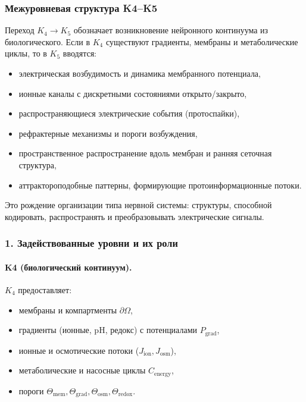 
\subsubsection{Межуровневая структура K4–K5}
\label{sec:crossk-k4-k5}

Переход $K_4 \rightarrow K_5$ обозначает возникновение нейронного
континуума из биологического. Если в $K_4$ существуют градиенты,
мембраны и метаболические циклы, то в $K_5$ вводятся:
\begin{itemize}
  \item электрическая возбудимость и динамика мембранного потенциала,
  \item ионные каналы с дискретными состояниями открыто/закрыто,
  \item распространяющиеся электрические события (протоспайки),
  \item рефрактерные механизмы и пороги возбуждения,
  \item пространственное распространение вдоль мембран и ранняя сеточная структура,
  \item аттрактороподобные паттерны, формирующие протоинформационные потоки.
\end{itemize}

Это рождение организации типа нервной системы: структуры, способной
кодировать, распространять и преобразовывать электрические сигналы.

\subsubsection{1. Задействованные уровни и их роли}

\paragraph{K4 (биологический континуум).}
$K_4$ предоставляет:
\begin{itemize}
  \item мембраны и компартменты $\partial\Omega$,
  \item градиенты (ионные, pH, редокс) с потенциалами $P_{\mathrm{grad}}$,
  \item ионные и осмотические потоки ($J_{\mathrm{ion}}, J_{\mathrm{osm}}$),
  \item метаболические и насосные циклы $C_{\mathrm{energy}}$,
  \item пороги $\Theta_{\mathrm{mem}}, \Theta_{\mathrm{grad}},
        \Theta_{\mathrm{osm}}, \Theta_{\mathrm{redox}}$.
\end{itemize}

